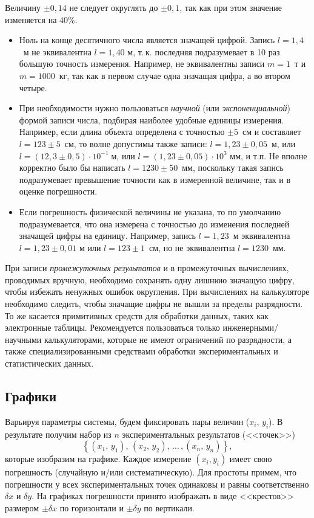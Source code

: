 Величину $\pm0{,}14$ не следует округлять до $\pm0{,}1$, так как
при этом значение изменяется на 40\%.
\begin{itemize}
\item Ноль на конце десятичного числа является значащей цифрой. Запись $l=1{,}4$~м
не эквивалентна $l=1{,}40$ м, т.\,к. последняя подразумевает в 10
раз большую точность измерения. Например, не эквивалентны записи $m=1$~т
и $m=1000$~кг, так как в первом случае одна значащая цифра, а во
втором четыре.
\item При необходимости нужно пользоваться\emph{ научной} (или \emph{экспоненциальной})
формой записи числа, подбирая наиболее удобные единицы измерения.
Например, если длина объекта определена с точностью $\pm5$~см и
составляет $l=123\pm5$~см, то волне допустимы также записи: $l=1{,}23\pm0{,}05$~м,
или $l=\left(12{,}3\pm0{,}5\right)\cdot10^{-1}\;\text{м}$, или $l=\left(1{,}23\pm0{,}05\right)\cdot10^{3}\text{ мм}$,
и т.п. Не вполне корректно было бы написать $l=1230\pm50$~мм, поскольку
такая запись подразумевает превышение точности как в измеренной величине,
так и в оценке погрешности.
\item Если погрешность физической величины не указана, то по умолчанию подразумевается,
что она измерена с точностью до изменения последней значащей цифры
на единицу. Например, запись $l=1{,}23$~м эквивалентна $l=1{,}23\pm0{,}01$
м или $l=123\pm1$~см, но не эквивалентна $l=1230$~мм.
\end{itemize}
При записи \emph{промежуточных результатов} и в промежуточных вычислениях,
проводимых вручную, необходимо сохранять одну лишнюю значащую цифру,
чтобы избежать ненужных ошибок округления. При вычислениях на калькуляторе
необходимо следить, чтобы значащие цифры не вышли за пределы разрядности.
То же касается примитивных средств для обработки данных, таких как
электронные таблицы. Рекомендуется пользоваться только инженерными/научными
калькуляторами, которые не имеют ограничений по разрядности, а также
специализированными средствами обработки экспериментальных и статистических
данных.

\subsection{Графики}

Варьируя параметры системы, будем фиксировать пары величин ($x_{i},\,y_{i}$).
В результате получим набор из $n$ экспериментальных результатов (<<точек>>)
\[
\left\{ (x_{1},\,y_{1}),\,(x_{2},\,y_{2}),\,\ldots\,,(x_{n},\,y_{n})\right\} ,
\]
которые изобразим на графике. Каждое измерение $\left(x_{i},y_{i}\right)$
имеет свою погрешность (случайную и/или систематическую). Для простоты
примем, что погрешности у всех экспериментальных точек одинаковы и
равны соответственно $\delta x$ и $\delta y$. На графиках погрешности
принято изображать в виде <<крестов>> размером
$\pm\delta x$ по горизонтали и $\pm\delta y$ по вертикали.

